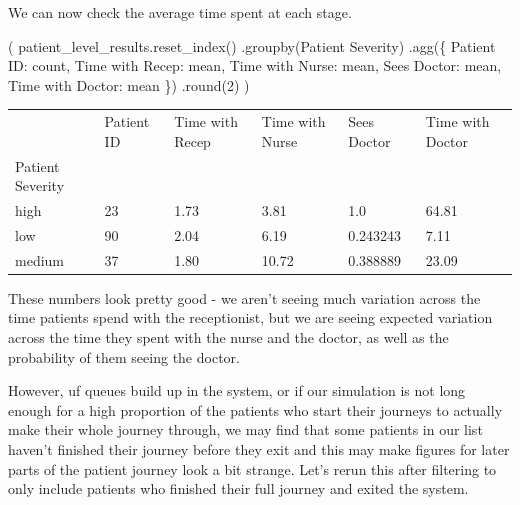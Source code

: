 \documentclass[
  letterpaper,
  DIV=11,
  numbers=noendperiod]{scrreprt}
\newenvironment{Shaded}{}{}
\newcommand{\BuiltInTok}[1]{\textcolor[rgb]{0.84,0.23,0.29}{#1}}
\newcommand{\DecValTok}[1]{\textcolor[rgb]{0.00,0.36,0.77}{#1}}
\newcommand{\NormalTok}[1]{\textcolor[rgb]{0.14,0.16,0.18}{#1}}
\newcommand{\StringTok}[1]{\textcolor[rgb]{0.01,0.18,0.38}{#1}}
\begin{document}
We can now check the average time spent at each stage.

\begin{Shaded}
\begin{Highlighting}[]
\NormalTok{(}
\NormalTok{    patient\_level\_results.reset\_index()}
\NormalTok{    .groupby(}\StringTok{\textquotesingle{}Patient Severity\textquotesingle{}}\NormalTok{)}
\NormalTok{    .agg(\{}
        \StringTok{\textquotesingle{}Patient ID\textquotesingle{}}\NormalTok{: }\StringTok{\textquotesingle{}count\textquotesingle{}}\NormalTok{,}
        \StringTok{\textquotesingle{}Time with Recep\textquotesingle{}}\NormalTok{: }\StringTok{\textquotesingle{}mean\textquotesingle{}}\NormalTok{,}
        \StringTok{\textquotesingle{}Time with Nurse\textquotesingle{}}\NormalTok{: }\StringTok{\textquotesingle{}mean\textquotesingle{}}\NormalTok{,}
        \StringTok{\textquotesingle{}Sees Doctor\textquotesingle{}}\NormalTok{: }\StringTok{\textquotesingle{}mean\textquotesingle{}}\NormalTok{,}
        \StringTok{\textquotesingle{}Time with Doctor\textquotesingle{}}\NormalTok{: }\StringTok{\textquotesingle{}mean\textquotesingle{}}
\NormalTok{    \})}
\NormalTok{    .}\BuiltInTok{round}\NormalTok{(}\DecValTok{2}\NormalTok{)}
\NormalTok{)}
\end{Highlighting}
\end{Shaded}

\begin{longtable}[]{@{}llllll@{}}
\toprule\noalign{}
& Patient ID & Time with Recep & Time with Nurse & Sees Doctor & Time
with Doctor \\
Patient Severity & & & & & \\
\midrule\noalign{}
\endhead
\bottomrule\noalign{}
\endlastfoot
high & 23 & 1.73 & 3.81 & 1.0 & 64.81 \\
low & 90 & 2.04 & 6.19 & 0.243243 & 7.11 \\
medium & 37 & 1.80 & 10.72 & 0.388889 & 23.09 \\
\end{longtable}

These numbers look pretty good - we aren't seeing much variation across
the time patients spend with the receptionist, but we are seeing
expected variation across the time they spent with the nurse and the
doctor, as well as the probability of them seeing the doctor.

However, uf queues build up in the system, or if our simulation is not
long enough for a high proportion of the patients who start their
journeys to actually make their whole journey through, we may find that
some patients in our list haven't finished their journey before they
exit and this may make figures for later parts of the patient journey
look a bit strange. Let's rerun this after filtering to only include
patients who finished their full journey and exited the system.
\end{document}
